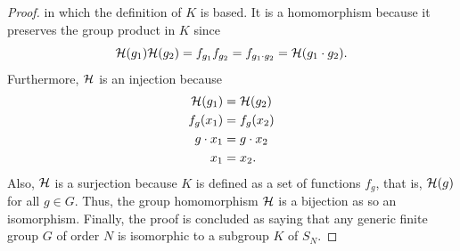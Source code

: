 \begin{proof}
    in which the definition of $K$ is based. It is a homomorphism because it preserves the group product in $K$ since
    \begin{equation}
        \mathcal{H}(g_1)\mathcal{H}(g_2) = f_{g_1}f_{g_2} = f_{g_1 \cdot g_2} = \mathcal{H}(g_1 \cdot g_2).
    \end{equation}
    Furthermore, $\mathcal{H}$ is an injection because 
    \begin{equation}
        \begin{split}
            \mathcal{H}(g_1) &= \mathcal{H}(g_2) \\
            f_g(x_1) &= f_g(x_2) \\
            g \cdot x_1 &= g \cdot x_2 \\
            x_1 &= x_2.
        \end{split}
    \end{equation}
    Also, $\mathcal{H}$ is a surjection because $K$ is defined as a set of functions $f_g$, that is, $\mathcal{H}(g)$ for all $g \in G$. Thus, the group homomorphism $\mathcal{H}$ is a bijection as so an isomorphism. Finally, the proof is concluded as saying that any generic finite group $G$ of order $N$ is isomorphic to a subgroup $K$ of $S_N$.
\end{proof}

